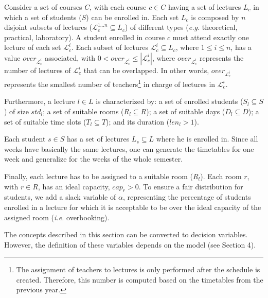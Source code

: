 \documentclass[runningheads]{llncs}
\begin{document}
Consider a set of courses $C$, with each course $c \in C$ having a set of lectures $L_c$ in which a set of students ($S$) can be enrolled in. Each set $L_c$ is composed by $n$ disjoint subsets of lectures ($\mathcal{L}_c^{1 \ldots n} \subseteq L_c$) of different types (\emph{e.g. }theoretical, practical, laboratory). A student enrolled in course $c$ must attend exactly one lecture of each set $\mathcal{L}_c^{i}$. Each subset of lectures $\mathcal{L}_c^i \subseteq L_c$, where $1\leq i \leq n$, has a value $over_{\mathcal{L}_c^{i}}$ associated, with $0 < over_{\mathcal{L}_c^{i}} \leq |\mathcal{L}_c^{i}|$, where $over_{\mathcal{L}_c^{i}}$ represents the number of lectures of $\mathcal{L}_c^{i}$ that can be overlapped. In other words, $over_{\mathcal{L}_c^{i}}$  represents the smallest number of teachers\footnote{The assignment of teachers to lectures is only performed after the schedule is created. Therefore, this number is computed based on the timetables from the previous year.} in charge of lectures in $\mathcal{L}_c^i$. %

Furthermore, a lecture $l \in L$ is characterized by: a set of enrolled students ($S_l \subseteq S$) of size $std_l$; a set of suitable rooms ($R_l \subseteq R$);
a set of suitable days  ($D_l \subseteq D$);
a set of suitable  time slots ($T_l \subseteq T$);
and its duration ($len_l > 1$).%

Each student $s \in S$ has a set of lectures $L_s \subseteq L$ where he is enrolled in. Since all weeks have basically the same lectures, one can generate the timetables for one week and generalize for the weeks of the whole semester.


Finally, each lecture has to be assigned to a suitable room ($R_l$). Each room $r$, with $r \in R$, has an ideal capacity, $cap_r > 0$. To ensure a fair distribution for students, we add a slack variable of $\alpha$, representing the percentage of students enrolled in a lecture for which it is acceptable to be over the ideal capacity of the assigned room (\emph{i.e.} overbooking).

The concepts described in this section can be converted to decision variables. However, the definition of these variables depends on the model (see Section 4).
\end{document}
